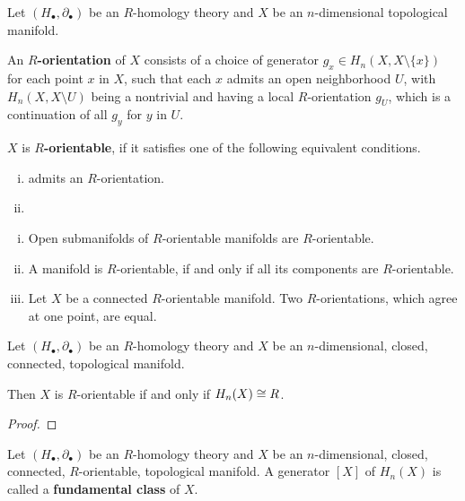 	\begin{definition}
		Let $(H_\bullet, \partial_\bullet)$ be an $R$-homology theory and $X$ be an $n$-dimensional topological manifold.

		An \textbf{$R$-orientation} of $X$ consists of a choice of generator $g_x \in H_n(X,X\setminus\{x\})$ for each point $x$ in $X$, such that each $x$ admits an open neighborhood $U$, with $H_n(X,X\setminus U)$ being a nontrivial  and having a local $R$-orientation $g_U$, which is a continuation of all $g_y$ for $y$ in $U$.

		$X$ is \textbf{$R$-orientable}, if it satisfies one of the following equivalent conditions.
		\begin{enumerate}[(i)]
			\item{
				admits  an $R$-orientation.
			}
			\item{
			}
		\end{enumerate}
	\end{definition}

	\begin{lemma}\vspace{-1.5em}
		\begin{enumerate}[(i)]
			\item{
				Open submanifolds of $R$-orientable manifolds are $R$-orientable.
			}
			\item{
				A manifold is $R$-orientable, if and only if all its components are $R$-orientable.
			}
			\item{
				Let $X$ be a connected $R$-orientable manifold. Two $R$-orientations, which agree at one point, are equal.
			}
		\end{enumerate}
	\end{lemma}

	\begin{proposition}
		Let $(H_\bullet, \partial_\bullet)$ be an $R$-homology theory and $X$ be an $n$-dimensional, closed, connected, topological manifold. 

		Then $X$ is $R$-orientable if and only if $H_n(X) \cong R$.
	\end{proposition}
	\begin{proof}
		\TODO{via Mayer Vietoris?}
	\end{proof}

	\begin{definition}
		Let $(H_\bullet, \partial_\bullet)$ be an $R$-homology theory and $X$ be an $n$-dimensional, closed, connected, $R$-orientable, topological manifold. A generator $[X]$ of $H_n(X)$ is called a \textbf{fundamental class} of $X$.
	\end{definition}
